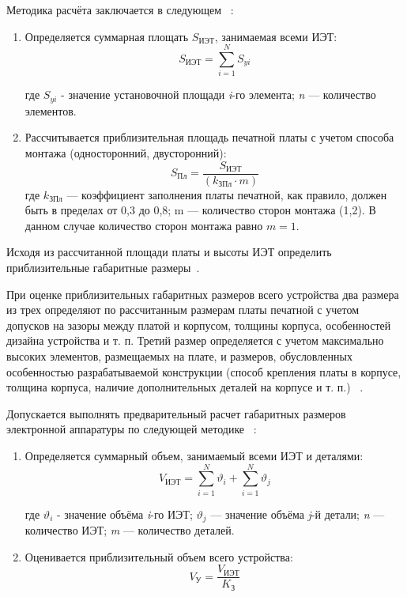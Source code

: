 Методика расчёта заключается в следующем ~\cite{Kostukevich2012}:
\begin{enumerate}
\item Определяется суммарная площать $S_{\textrm{ИЭТ}}$, занимаемая всеми ИЭТ:
  \begin{equation}
    S_{\textrm{ИЭТ}} = \sum^N_{i=1}S_{yi}
  \end{equation}

  где $S_{yi}$ - значение установочной площади \textit{i}-го элемента;
  \textit{n} —  количество элементов.
  
\item Рассчитывается приблизительная площадь печатной платы с учетом
  способа монтажа (односторонний, двусторонний):
  \begin{equation}
    S_{\textrm{Пл}} = \frac{S_{\textrm{ИЭТ}}}{(k_{\textrm{ЗПл}} \cdot m)}
  \end{equation}
  где $k_{\textrm{ЗПл}}$ — коэффициент заполнения платы печатной, как правило,
  должен быть в пределах от 0,3 до 0,8;
  m — количество сторон монтажа (1,2).
  В данном случае количество сторон монтажа равно $m=1$.
\end{enumerate}


Исходя из рассчитанной площади платы и высоты ИЭТ определить
приблизительные габаритные размеры~\cite{Kostukevich2012}.

При оценке приблизительных габаритных размеров всего устройства два
размера из трех определяют по рассчитанным размерам платы печатной с
учетом допусков на зазоры между платой и корпусом, толщины корпуса,
особенностей дизайна устройства и т. п.
Третий размер определяется с учетом максимально высоких элементов,
размещаемых на плате, и размеров, обусловленных особенностью
разрабатываемой конструкции (способ крепления платы в корпусе,
толщина корпуса, наличие дополнительных деталей на корпусе и т. п.) ~\cite{Kostukevich2012}.

Допускается выполнять предварительный расчет габаритных размеров
электронной аппаратуры по следующей методике ~\cite{Kostukevich2012}:
\begin{enumerate}
\item Определяется суммарный объем, занимаемый всеми ИЭТ и деталями:
  \begin{equation}
    V_{\textit{ИЭТ}} = \sum^N_{i=1}\vartheta_i +   \sum^N_{i=1}\vartheta_j
  \end{equation}

где $\vartheta_i$ - значение объёма \textit{i}-го ИЭТ;
$\vartheta_j$ — значение объёма \textit{j}-й детали;
\textit{n} — количество ИЭТ;
\textit{m} — количество деталей.
\item Оценивается приблизительный объем всего устройства:
  \begin{equation}
    V_{\textrm{У}} = \frac{V_{\textrm{ИЭТ}}}{K_{\textrm{З}}}
  \end{equation}
\end{enumerate}

